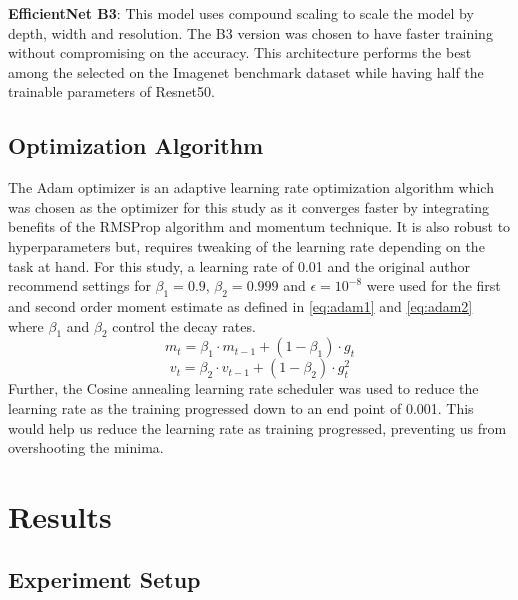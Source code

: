 \documentclass[conference]{IEEEtran}
\begin{document}
\textbf{EfficientNet B3}: This model uses compound scaling to scale the model by 
depth, width and resolution. The B3 version was chosen to have faster training 
without compromising on the accuracy. \cite{b20} This architecture performs the 
best among the selected on the Imagenet benchmark dataset while having half 
 the trainable parameters of Resnet50.


 \subsection{Optimization Algorithm}
 The Adam optimizer \cite{kingma2014adam} is an adaptive learning rate optimization 
 algorithm which was chosen as the optimizer for this study as it converges faster 
 by integrating benefits of the RMSProp algorithm and momentum technique. It is also 
 robust to hyperparameters but, requires tweaking of the learning rate depending on 
 the task at hand. For this study, a learning rate of 0.01 and the original author 
 recommend settings for $\beta_{1} = 0.9$, $\beta_{2} = 0.999$ and 
 $\epsilon = 10^{-8}$ were used for the first and second order moment estimate 
 as defined in \eqref{eq:adam1} and \eqref{eq:adam2} where $\beta_{1}$ and 
 $\beta_{2}$ control the decay rates.
 \begin{equation}
 m_{t} = \beta_{1} \cdot m_{t-1} + (1 - \beta_{1}) \cdot g_{t}
 \label{eq:adam1}
 \end{equation}
 \begin{equation}
   v_{t} = \beta_{2} \cdot v_{t-1} + (1 - \beta_{2}) \cdot g_{t}^{2}
   \label{eq:adam2}
   \end{equation}
 Further, the Cosine annealing \cite{loshchilov2016sgdr} learning rate scheduler was used 
 to reduce the learning rate as the training progressed down to an end point of 0.001. This 
 would help us reduce the learning rate as training progressed, preventing us from overshooting 
 the minima.

\section{Results} 
\label{sec:result}
\subsection{Experiment Setup}
\end{document}
